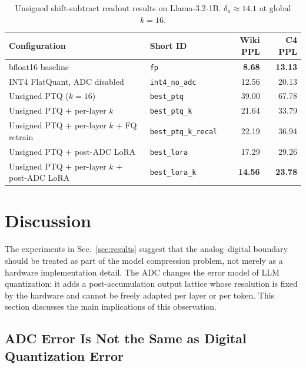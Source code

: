 \documentclass[a4paper,11pt,oneside]{article}
\theoremstyle{breakstyle}
\begin{document}
  \begin{table}[htbp]
    \centering
    \caption{Unsigned shift-subtract readout results on
             Llama-3.2-1B. $\delta_u \approx 14.1$ at global $k = 16$.}
    \label{tab:unipolar}
    \renewcommand{\arraystretch}{1.2}
    \begin{tabular}{@{}llrr@{}}
      \toprule
      \textbf{Configuration} & \textbf{Short ID} & \textbf{Wiki PPL} & \textbf{C4 PPL} \\
      \midrule
      bfloat16 baseline                           & \texttt{fp}                  & \textbf{8.68}  & \textbf{13.13} \\
      INT4 FlatQuant, ADC disabled                & \texttt{int4\_no\_adc}       & 12.56          & 20.13          \\
      Unsigned PTQ ($k = 16$)                     & \texttt{best\_ptq}           & 39.00          & 67.78          \\
      Unsigned PTQ $+$ per-layer $k$              & \texttt{best\_ptq\_k}        & 21.64          & 33.79          \\
      Unsigned PTQ $+$ per-layer $k$ $+$ FQ retrain & \texttt{best\_ptq\_k\_recal} & 22.19          & 36.94          \\
      Unsigned PTQ $+$ post-ADC LoRA              & \texttt{best\_lora}          & 17.29          & 29.26          \\
      Unsigned PTQ $+$ per-layer $k$ $+$ post-ADC LoRA & \texttt{best\_lora\_k}     & \textbf{14.56} & \textbf{23.78} \\
      \bottomrule
    \end{tabular}
  \end{table}

  \section{Discussion}
  \label{sec:discussion}

  The experiments in Sec.~\ref{sec:results} suggest that the
  analog--digital boundary should be treated as part of the model
  compression problem, not merely as a hardware implementation detail.
  The ADC changes the error model of LLM quantization: it adds a
  post-accumulation output lattice whose resolution is fixed by the
  hardware and cannot be freely adapted per layer or per token.  This
  section discusses the main implications of this observation.

  \subsection{ADC Error Is Not the Same as Digital Quantization Error}
\end{document}
